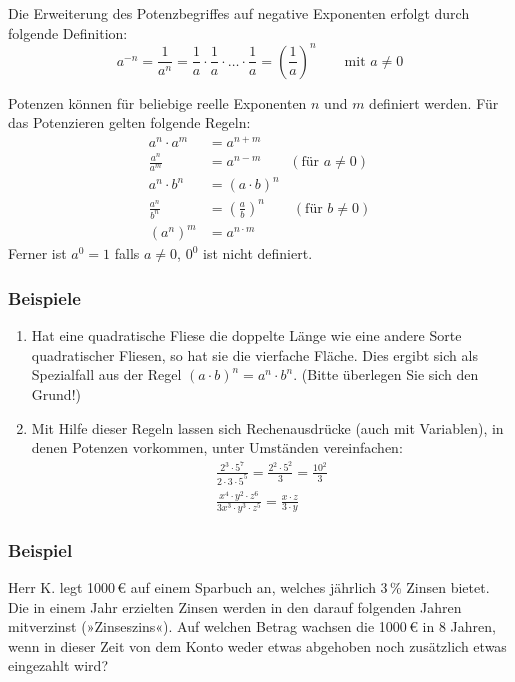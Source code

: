 Die Erweiterung des Potenzbegriffes auf negative Exponenten erfolgt durch folgende Definition:
\[ a^{-n} = \frac{1}{a^n} = \frac{1}{a} \cdot \frac{1}{a} \cdot \ldots \cdot \frac{1}{a} = \left(\frac{1}{a}\right)^n \qquad \text{mit } a \neq 0 \]

Potenzen können für beliebige reelle Exponenten $n$ und $m$ definiert werden. Für das Potenzieren gelten folgende Regeln:
\begin{align*}
  a^n \cdot a^m &= a^{n+m}\\
  \frac{a^n}{a^m} &= a^{n-m} \qquad (\text{für } a \neq 0)\\
  a^n \cdot b^n &= (a \cdot b)^n\\
  \frac{a^n}{b^n} &= \left(\frac{a}{b}\right)^n \qquad (\text{für } b \neq 0)\\
  (a^n)^m &= a^{n \cdot m}
\end{align*}
Ferner ist $a^0 = 1$ falls $a \neq 0$, $0^0$ ist nicht definiert.

\subsubsection{Beispiele}

\begin{enumerate}[label=\alph*)]
  \item Hat eine quadratische Fliese die doppelte Länge wie eine andere Sorte quadratischer Fliesen, so hat sie die vierfache Fläche. Dies ergibt sich als Spezialfall aus der Regel $(a \cdot b)^n = a^n \cdot b^n$. (Bitte überlegen Sie sich den Grund!)
  \item Mit Hilfe dieser Regeln lassen sich Rechenausdrücke (auch mit Variablen), in denen Potenzen vorkommen, unter Umständen vereinfachen:
  \begin{gather*}\frac{2^3 \cdot 5^7}{2 \cdot 3 \cdot 5^5} = \frac{2^2 \cdot 5^2}{3} = \frac{10^2}{3} \\ \frac{x^4 \cdot y^2 \cdot z^6}{3x^3 \cdot y^3 \cdot z^5} = \frac{x \cdot z}{3 \cdot y} \end{gather*}
\end{enumerate}\beispielende

\subsubsection{Beispiel}

Herr K. legt 1000\,€ auf einem Sparbuch an, welches jährlich 3\,\% Zinsen bietet. Die in einem Jahr erzielten Zinsen werden in den darauf folgenden Jahren mitverzinst (»Zinseszins«). Auf welchen Betrag wachsen die 1000\,€ in 8 Jahren, wenn in dieser Zeit von dem Konto weder etwas abgehoben noch zusätzlich etwas eingezahlt wird?

